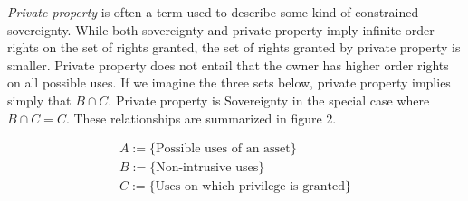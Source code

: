 \documentclass[12pt]{report}
\numberwithin{equation}{section}
\begin{document}
\newpage
\textit{Private property} is often a term used to describe some kind of constrained sovereignty. While both sovereignty and private property imply infinite order rights on the set of rights granted, the set of rights granted by private property is smaller. Private property does not entail that the owner has higher order rights on all possible uses. If we imagine the three sets below, private property implies simply that $B \cap C$. Private property is Sovereignty in the special case where $B\cap C=C$. These relationships are summarized in figure 2.


\begin{align*}
A:=\{ \text{Possible uses of an asset} \} \\
B:=\{\text{Non-intrusive uses} \} \\
C:=\{\text{Uses on which privilege is granted}\}
\end{align*}
\end{document}
